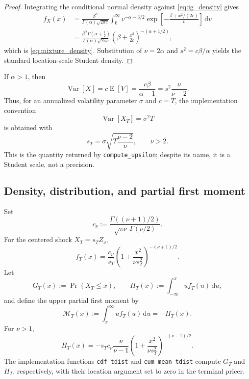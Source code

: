 \documentclass[11pt,a4paper]{article}
\DeclareMathOperator{\Var}{Var}
\DeclareMathOperator{\E}{E}
\newcommand{\dd}{\,\mathrm{d}}
\newcommand{\cdf}{G}
\newcommand{\cM}{\mathcal{M}}
\begin{document}
\begin{proof}
Integrating the conditional normal density against \eqref{eq:ig_density} gives
\begin{align*}
f_X(x)
&=\frac{\beta^\alpha}{\Gamma(\alpha)\sqrt{2\pi c}}
  \int_0^\infty
  v^{-\alpha-3/2}
  \exp\left[-\frac{\beta+x^2/(2c)}{v}\right]\dd v\\
&=\frac{\beta^\alpha\Gamma(\alpha+\tfrac12)}
        {\Gamma(\alpha)\sqrt{2\pi c}}
  \left(\beta+\frac{x^2}{2c}\right)^{-(\alpha+1/2)},
\end{align*}
which is \eqref{eq:mixture_density}.  Substitution of $\nu=2\alpha$ and
$s^2=c\beta/\alpha$ yields the standard location-scale Student density.
\end{proof}

If $\alpha>1$, then
\begin{equation}
  \Var[X]=c\E[V]=\frac{c\beta}{\alpha-1}
  =s^2\frac{\nu}{\nu-2}.
  \label{eq:variance_match_ig}
\end{equation}
Thus, for an annualized volatility parameter $\sigma$ and $c=T$, the
implementation convention
\begin{equation}
  \Var[X_T]=\sigma^2T
  \label{eq:code_variance_target}
\end{equation}
is obtained with
\begin{equation}
  s_T=\sigma\sqrt{T\frac{\nu-2}{\nu}},\qquad \nu>2.
  \label{eq:code_student_scale}
\end{equation}
This is the quantity returned by \texttt{compute\_upsilon}; despite its name,
it is a Student scale, not a precision.

\subsection{Density, distribution, and partial first moment}

Set
\begin{equation}
  c_\nu:=\frac{\Gamma((\nu+1)/2)}
  {\sqrt{\pi\nu}\,\Gamma(\nu/2)}.
\end{equation}
For the centered shock $X_T=s_TZ_\nu$,
\begin{equation}
  f_T(x)=\frac{c_\nu}{s_T}
  \left(1+\frac{x^2}{\nu s_T^2}\right)^{-(\nu+1)/2}.
  \label{eq:student_density}
\end{equation}
Let
\begin{equation}
  \cdf_T(x):=\Pr(X_T\le x),\qquad
  H_T(x):=\int_{-\infty}^x u f_T(u)\dd u,
  \label{eq:cdf_lower_moment}
\end{equation}
and define the upper partial first moment by
\begin{equation}
  \cM_T(x):=\int_x^\infty u f_T(u)\dd u=-H_T(x).
  \label{eq:upper_moment}
\end{equation}
For $\nu>1$,
\begin{equation}
  H_T(x)=
  -s_Tc_\nu\frac{\nu}{\nu-1}
  \left(1+\frac{x^2}{\nu s_T^2}\right)^{-(\nu-1)/2}.
  \label{eq:student_lower_moment}
\end{equation}
The implementation functions \texttt{cdf\_tdist} and
\texttt{cum\_mean\_tdist} compute $\cdf_T$ and $H_T$, respectively, with
their location argument set to zero in the terminal pricer.
\end{document}
